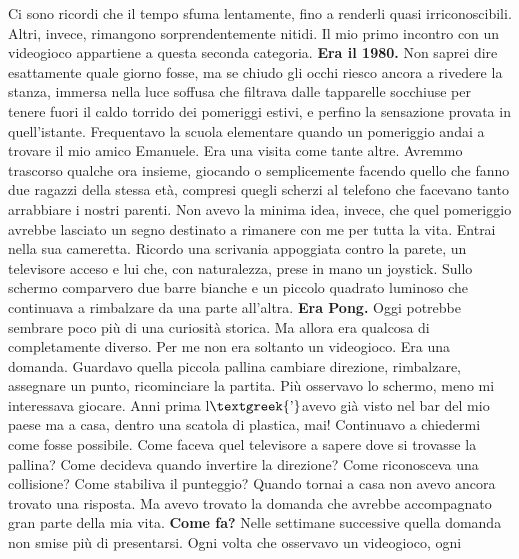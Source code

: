 \documentclass{article}
\author{HP}
\date{2026-08-19}
\begin{document}
Ci sono ricordi che il tempo sfuma lentamente, fino a renderli quasi irriconoscibili. Altri, invece, rimangono
sorprendentemente nitidi. Il mio primo incontro con un videogioco appartiene a questa seconda categoria.\newline
\textbf{Era il 1980.}\newline
Non saprei dire esattamente quale giorno fosse, ma se chiudo gli occhi riesco ancora a rivedere la stanza, immersa nella
luce soffusa che filtrava dalle tapparelle socchiuse per tenere fuori il caldo torrido dei pomeriggi estivi, e perfino
la sensazione provata in quell'istante.\newline
Frequentavo la scuola elementare quando un pomeriggio andai a trovare il mio amico Emanuele. Era una visita come tante
altre. Avremmo trascorso qualche ora insieme, giocando o semplicemente facendo quello che fanno due ragazzi della
stessa età, compresi quegli scherzi al telefono che facevano tanto arrabbiare i nostri parenti. Non avevo la minima
idea, invece, che quel pomeriggio avrebbe lasciato un segno destinato a rimanere con me per tutta la vita.\newline
Entrai nella sua cameretta. Ricordo una scrivania appoggiata contro la parete, un televisore acceso e lui che, con
naturalezza, prese in mano un joystick. Sullo schermo comparvero due barre bianche e un piccolo quadrato luminoso che
continuava a rimbalzare da una parte all'altra.\newline
\textbf{Era Pong.}\newline
Oggi potrebbe sembrare poco più di una curiosità storica. Ma allora era qualcosa di completamente diverso. Per me non
era soltanto un videogioco. Era una domanda.\newline
Guardavo quella piccola pallina cambiare direzione, rimbalzare, assegnare un punto, ricominciare la partita. Più
osservavo lo schermo, meno mi interessava giocare. Anni prima l$\text{\textgreek{’}}$avevo già visto nel bar del mio
paese ma a casa, dentro una scatola di plastica, mai! Continuavo a chiedermi come fosse possibile. Come faceva quel
televisore a sapere dove si trovasse la pallina? Come decideva quando invertire la direzione? Come riconosceva una
collisione? Come stabiliva il punteggio?\newline
Quando tornai a casa non avevo ancora trovato una risposta. Ma avevo trovato la domanda che avrebbe accompagnato gran
parte della mia vita.\newline
\textbf{Come fa?}\newline
Nelle settimane successive quella domanda non smise più di presentarsi. Ogni volta che osservavo un videogioco, ogni
\end{document}
